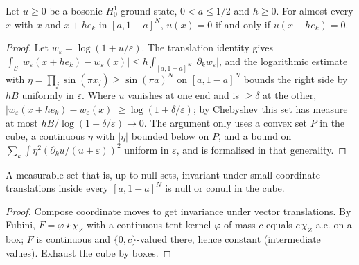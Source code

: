 \begin{lemma}
  \label{lem:line_zeroset}
  \leanok
  Let $u\ge0$ be a bosonic $H^1_0$ ground state, $0<a\le1/2$ and $h\ge0$. For almost every $x$ with $x$ and $x+he_k$
  in $[a,1-a]^N$, $u(x)=0$ if and only if $u(x+he_k)=0$.
\end{lemma}
\begin{proof}
  \leanok
  Let $w_\varepsilon=\log(1+u/\varepsilon)$. The translation identity gives
  $\int_S|w_\varepsilon(x+he_k)-w_\varepsilon(x)|\le h\int_{[a,1-a]^N}|\partial_kw_\varepsilon|$, and the logarithmic estimate with
  $\eta=\prod_j\sin(\pi x_j)\ge\sin(\pi a)^N$ on $[a,1-a]^N$ bounds the right side by $hB$ uniformly in $\varepsilon$. Where $u$
  vanishes at one end and is $\ge\delta$ at the other, $|w_\varepsilon(x+he_k)-w_\varepsilon(x)|\ge\log(1+\delta/\varepsilon)$; by
  Chebyshev this set has measure at most $hB/\log(1+\delta/\varepsilon)\to0$. The argument only uses a convex set
  $P$ in the cube, a continuous $\eta$ with $|\eta|$ bounded below on $P$, and a bound on
  $\sum_k\int\eta^2(\partial_ku/(u+\varepsilon))^2$ uniform in $\varepsilon$, and is formalised in that generality.
\end{proof}

\begin{lemma}
  \label{lem:line_invariant}
  \leanok
  A measurable set that is, up to null sets, invariant under small coordinate translations inside every
  $[a,1-a]^N$ is null or conull in the cube.
\end{lemma}
\begin{proof}
  \leanok
  Compose coordinate moves to get invariance under vector translations. By Fubini, $F=\varphi\star\chi_Z$ with a
  continuous tent kernel $\varphi$ of mass $c$ equals $c\,\chi_Z$ a.e. on a box; $F$ is continuous and $\{0,c\}$-valued
  there, hence constant (intermediate values). Exhaust the cube by boxes.
\end{proof}

